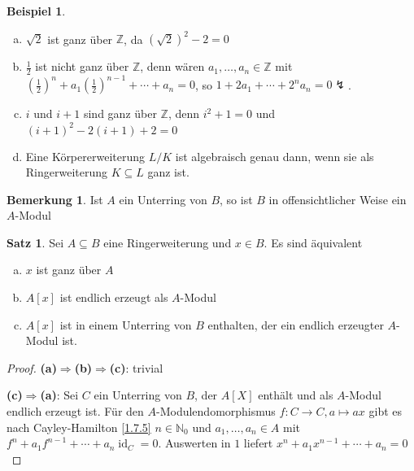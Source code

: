 \documentclass[
twoside=semi,
fontsize=12,
DIV=12, 
cleardoublepage=current,
leqno,
headings=optiontoheadandtoc, 
toc=idx
]{scrbook}
\newcommand{\N}{\mathbb{N}}
\newcommand{\Z}{\mathbb{Z}}
\newcommand{\brac}[1]{\left( #1 \right)}
\DeclareMathOperator{\id}{id}
\theoremstyle{definition}
\newtheorem{bemerkung}[definition]{Bemerkung}
\newtheorem{beispiel}[definition]{Beispiel}
\newtheorem{satz}[definition]{Satz}
\begin{document}
	\begin{beispiel}\label{2.1.3}\hfill
		\begin{enumerate}[(a)]
			\item $\sqrt{2}$ ist ganz \"uber $\Z$, da $(\sqrt{2})^2 -2 = 0$
			\item $\frac{1}{2}$ ist nicht ganz \"uber $\Z$, denn w\"aren $a_1,\dots, a_n \in \Z$ mit $\brac{\frac{1}{2}}^n + a_1\brac{\frac{1}{2}}^{n-1} + \cdots + a_n = 0$, so $1 + 2a_1 + \cdots + 2^na_n = 0\lightning$.
			\item $i$ und $i+1$ sind ganz \"uber $\Z$, denn $i^2+1 = 0$ und $(i+1)^2 - 2(i+1)+2 = 0$
			\item Eine K\"orpererweiterung $L/K$ ist algebraisch genau dann, wenn sie als Ringerweiterung $K \subseteq L$ ganz ist.
		\end{enumerate}	
	\end{beispiel}

	\begin{bemerkung}\label{2.1.4}\hfill\newline
		Ist $A$ ein Unterring von $B$, so ist $B$ in offensichtlicher Weise ein $A$-Modul
	\end{bemerkung}

	\begin{satz}\label{2.1.5}\hfill\newline
		Sei $A \subseteq B$ eine Ringerweiterung und $x \in B$. Es sind \"aquivalent
		\begin{enumerate}[(a)]
			\item $x$ ist ganz \"uber $A$
			\item $A[x]$ ist endlich erzeugt als $A$-Modul
			\item $A[x]$ ist in einem Unterring von $B$ enthalten, der ein endlich erzeugter $A$-Modul ist.
		\end{enumerate}
	
		\begin{proof}
			\textbf{(a)$\Longrightarrow$(b)$\Longrightarrow$(c)}: trivial
			
			\medskip\noindent
			\textbf{(c)$\Longrightarrow$(a)}: Sei $C$ ein Unterring von $B$, der $A[X]$ enth\"alt und als $A$-Modul endlich erzeugt ist.
			F\"ur den $A$-Modulendomorphismus $f:C\to C, a\mapsto ax$ gibt es nach Cayley-Hamilton \ref{1.7.5} $n\in\N_0$ und $a_1,\dots, a_n\in A$ mit 
			$f^n +a_1f^{n-1}+\cdots+a_n\id_C= 0$. Auswerten in $1$ liefert $x^n+a_1x^{n-1}+\cdots+a_n = 0$ 
 		\end{proof}
	\end{satz}
\end{document}
